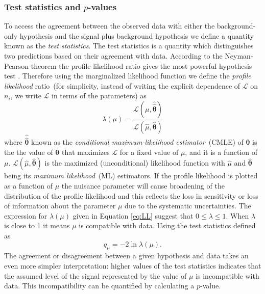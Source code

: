 \subsubsection{Test statistics and $p$-values} 
To access the agreement between the observed data with either the background-only hypothesis and the signal plus background hypothesis we define a quantity known as the \textit{test statistics}. The test statistics is a quantity which distinguishes two predictions based on their agreement with data.
According to the Neyman-Pearson theorem the profile likelihood ratio gives the most powerful hypothesis test \cite{NPT}. Therefore using the marginalized likelihood function we define the \textit{profile likelihood} ratio~(for simplicity, instead of writing the explicit dependence of $\mathcal{L}$ on $n_{i}$, we write  $\mathcal{L}$ in terms of the parameters) as
\begin{equation}\label{eq:PLL}
\lambda(\mu) =  \frac{\mathcal{L}(\mu, \hat{\hat{\mathbf{\theta}}})}{\mathcal{L}(\hat{\mu}, \hat{\mathbf{\theta}} )}
\end{equation}
where $\hat{\hat{\mathbf{\theta}}}$ known as the \textit{conditional maximum-likelihood estimator}~(CMLE) of $\mathbf{\theta}$ is the the value of $\mathbf{\theta}$ that maximizes $\mathcal{L}$ for a fixed value of $\mu$, and it is a function of $\mu$.  $\mathcal{L}(\hat{\mu}, \hat{\mathbf{\theta}} )$ is the maximized (unconditional) likelihood function with $\hat{\mu}$ and $\hat{\mathbf{\theta}}$ being its \textit{maximum likelihood}~(ML) estimators. 
\newline
If the profile likelihood is plotted as a function of $\mu$ the nuisance parameter will cause broadening of the distribution of the profile likelihood and this reflects the loss in sensitivity or loss of information about the parameter $\mu$ due to the systematic uncertainties.
\newline
The expression for $\lambda(\mu)$ given in Equation \ref{eq:LL} suggest that $0 \leq \lambda \leq 1$. When $\lambda$ is close to 1 it means $\mu$ is compatible with data. Using the test statistics defined as
\begin{equation}
 q_{\mu} = -2\ln \lambda(\mu).
\end{equation}
The agreement or disagreement between a given hypothesis and data takes an even more simpler interpretation: higher values of the test statistics indicates that the assumed level of the signal represented by the value of $\mu$ is incompatible with data. This incompatibility can be quantified by calculating a $p$-value. 
